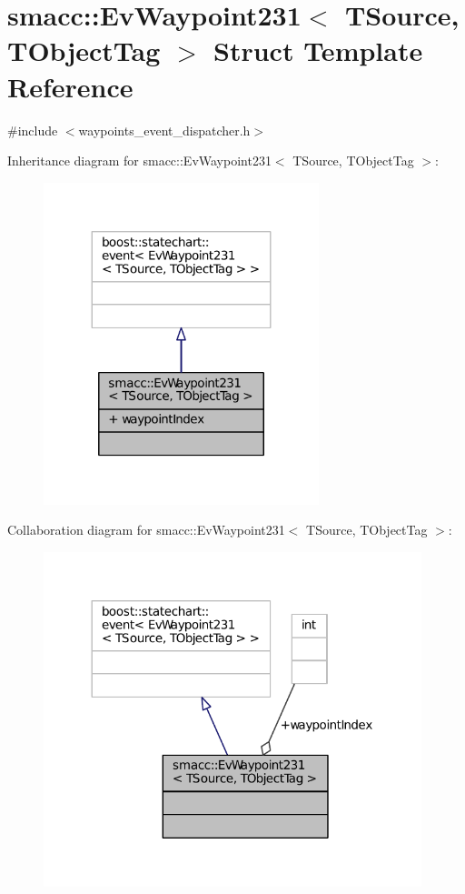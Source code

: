 \hypertarget{structsmacc_1_1EvWaypoint231}{}\section{smacc\+:\+:Ev\+Waypoint231$<$ T\+Source, T\+Object\+Tag $>$ Struct Template Reference}
\label{structsmacc_1_1EvWaypoint231}


{\ttfamily \#include $<$waypoints\+\_\+event\+\_\+dispatcher.\+h$>$}



Inheritance diagram for smacc\+:\+:Ev\+Waypoint231$<$ T\+Source, T\+Object\+Tag $>$\+:
\nopagebreak
\begin{figure}[H]
\begin{center}
\leavevmode
\includegraphics[width=227pt]{structsmacc_1_1EvWaypoint231__inherit__graph}
\end{center}
\end{figure}


Collaboration diagram for smacc\+:\+:Ev\+Waypoint231$<$ T\+Source, T\+Object\+Tag $>$\+:
\nopagebreak
\begin{figure}[H]
\begin{center}
\leavevmode
\includegraphics[width=312pt]{structsmacc_1_1EvWaypoint231__coll__graph}
\end{center}
\end{figure}
